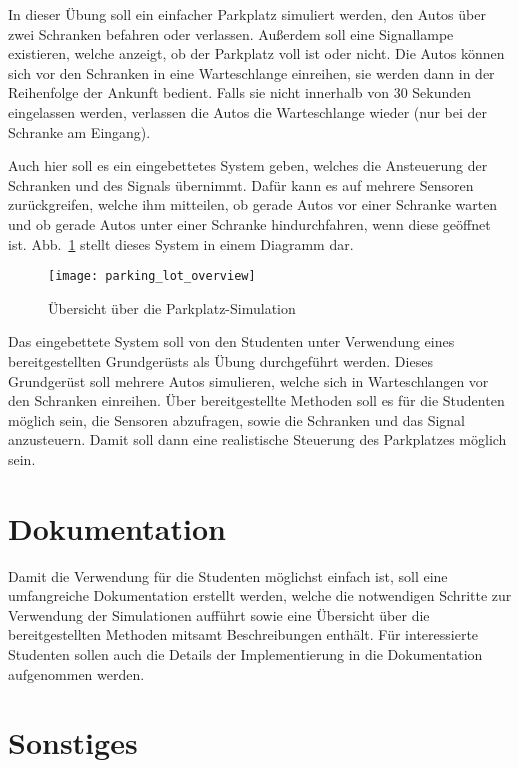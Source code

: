 \documentclass[oneside]{elaboration}
\begin{document}
In dieser Übung soll ein einfacher Parkplatz simuliert werden, den Autos
über zwei Schranken befahren oder verlassen. Außerdem soll eine Signallampe
existieren, welche anzeigt, ob der Parkplatz voll ist oder nicht. Die Autos
können sich vor den Schranken in eine Warteschlange einreihen, sie werden dann
in der Reihenfolge der Ankunft bedient. Falls sie nicht innerhalb von 30
Sekunden eingelassen werden, verlassen die Autos die Warteschlange wieder (nur
bei der Schranke am Eingang).

Auch hier soll es ein eingebettetes System geben, welches die Ansteuerung der
Schranken und des Signals übernimmt. Dafür kann es auf mehrere Sensoren
zurückgreifen, welche ihm mitteilen, ob gerade Autos vor einer Schranke warten
und ob gerade Autos unter einer Schranke hindurchfahren, wenn diese geöffnet
ist. Abb.~\ref{fig:parking_lot_overview} stellt dieses System in einem Diagramm
dar.

\begin{figure}[hbt]
\centering
\texttt{[image: parking\_lot\_overview]}
\caption{Übersicht über die Parkplatz-Simulation}
\label{fig:parking_lot_overview}
\end{figure}

Das eingebettete System soll von den Studenten unter Verwendung eines
bereitgestellten Grundgerüsts als Übung durchgeführt werden. Dieses Grundgerüst
soll mehrere Autos simulieren, welche sich in Warteschlangen vor den Schranken
einreihen. Über bereitgestellte Methoden soll es für die Studenten möglich sein,
die Sensoren abzufragen, sowie die Schranken und das Signal anzusteuern. Damit
soll dann eine realistische Steuerung des Parkplatzes möglich sein.

\section{Dokumentation}
\label{sec:dokumentation}

Damit die Verwendung für die Studenten möglichst einfach ist, soll eine
umfangreiche Dokumentation erstellt werden, welche die notwendigen Schritte zur
Verwendung der Simulationen aufführt sowie eine Übersicht über die
bereitgestellten Methoden mitsamt Beschreibungen enthält. Für interessierte
Studenten sollen auch die Details der Implementierung in die Dokumentation
aufgenommen werden.

\section{Sonstiges}
\label{sec:sonstiges}
\end{document}
